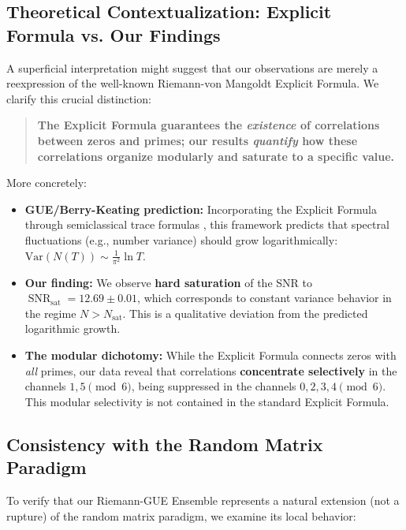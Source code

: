 \documentclass[12pt, a4paper]{article}
\theoremstyle{plain}
\theoremstyle{definition}
\theoremstyle{remark}
\newcommand{\SNR}{\operatorname{SNR}}
\begin{document}
\subsection{Theoretical Contextualization: Explicit Formula vs. Our Findings}
\label{subsec:contexto_teorico}

A superficial interpretation might suggest that our observations are merely a reexpression of the well-known Riemann-von Mangoldt Explicit Formula. We clarify this crucial distinction:

\begin{quote}
\textbf{The Explicit Formula guarantees the \textit{existence} of correlations between zeros and primes; our results \textit{quantify} how these correlations organize modularly and saturate to a specific value.}
\end{quote}

More concretely:

\begin{itemize}
    \item \textbf{GUE/Berry-Keating prediction:} Incorporating the Explicit Formula through semiclassical trace formulas \cite{berry1985}, this framework predicts that spectral fluctuations (e.g., number variance) should grow logarithmically: $\text{Var}(N(T)) \sim \frac{1}{\pi^2}\ln T$.
    
    \item \textbf{Our finding:} We observe \textbf{hard saturation} of the SNR to $\SNR_{\text{sat}} = 12.69 \pm 0.01$, which corresponds to constant variance behavior in the regime $N > N_{\text{sat}}$. This is a qualitative deviation from the predicted logarithmic growth.
    
    \item \textbf{The modular dichotomy:} While the Explicit Formula connects zeros with \textit{all} primes, our data reveal that correlations \textbf{concentrate selectively} in the channels $1,5 \pmod{6}$, being suppressed in the channels $0,2,3,4 \pmod{6}$. This modular selectivity is not contained in the standard Explicit Formula.
\end{itemize}

\subsection{Consistency with the Random Matrix Paradigm}
\label{subsec:consistencia_rmt}

To verify that our Riemann-GUE Ensemble represents a natural extension (not a rupture) of the random matrix paradigm, we examine its local behavior:
\end{document}
